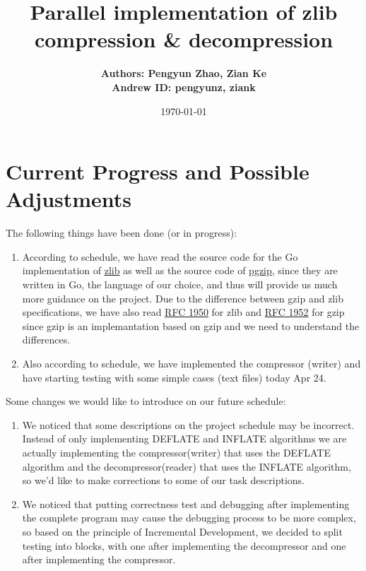 \documentclass{article}
\title{Parallel implementation of zlib compression \& decompression}
\author{\textbf{Authors: Pengyun Zhao, Zian Ke}\\\textbf{Andrew ID: pengyunz, ziank}}
\date{\today}
\begin{document}
\maketitle

\section{Current Progress and Possible Adjustments}
The following things have been done (or in progress):
\begin{enumerate}[(1)]
    \item According to schedule, we have read the source code for the Go implementation of \href{https://github.com/golang/go/tree/master/src/compress/zlib}{zlib} as well as the source code of \href{https://github.com/klauspost/pgzip}{pgzip}, since they are written in Go, the language of our choice, and thus will provide us much more guidance on the project. Due to the difference between gzip and zlib specifications, we have also read \href{https://tools.ietf.org/html/rfc1950}{RFC 1950} for zlib and \href{https://tools.ietf.org/html/rfc1952}{RFC 1952} for gzip since gzip is an implemantation based on gzip and we need to understand the differences.
    \item Also according to schedule, we have implemented the compressor (writer) and have starting testing with some simple cases (text files) today Apr 24. 
\end{enumerate}
Some changes we would like to introduce on our future schedule:
\begin{enumerate}[(1)]
    \item We noticed that some descriptions on the project schedule may be incorrect. Instead of only implementing DEFLATE and INFLATE algorithms we are actually implementing the compressor(writer) that uses the DEFLATE algorithm and the decompressor(reader) that uses the INFLATE algorithm, so we'd like to make corrections to some of our task descriptions.
    \item We noticed that putting correctness test and debugging after implementing the complete program may cause the debugging process to be more complex, so based on the principle of Incremental Development, we decided to split testing into blocks, with one after implementing the decompressor and one after implementing the compressor.
\end{enumerate}
\end{document}
